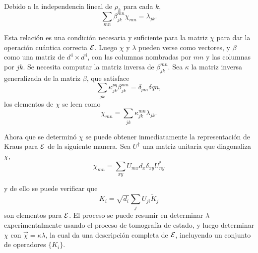 Debido a la independencia lineal de $\rho_k$ para cada $k$, 
\begin{equation}
    \sum_{mn}\beta_{jk}^{mn}\chi_{mn}=\lambda_{jk}.
\end{equation}

Esta relación es una condición necesaria y suficiente para la matriz $\chi$ para dar la operación cuántica correcta $\mathcal{E}$. Luego $\chi$ y $\lambda$ pueden verse como vectores, y $\beta$ como una matriz de $d^4\times d^4$, con las columnas nombradas por ${mn}$ y las columnas por ${jk}$. Se necesita computar la matriz inversa de $\beta_{jk}^{mn}$. Sea $\kappa$ la matriz inversa generalizada de la matriz $\beta$, que satisface \[\sum_{jk}\kappa_{jk}^{pq}\beta_{jk}^{mn}=\delta_{pm}\delta{qn},\] los elementos de $\chi$ se leen como 
\begin{equation}
    \chi_{mn}=\sum_{jk}\kappa_{jk}^{mn}\lambda_{jk}.
\end{equation}

Ahora que se determinó $\chi$ se puede obtener inmediatamente la representación de Kraus para $\mathcal{E}$ de la siguiente manera. Sea $U^\dagger$ una matriz unitaria que diagonaliza $\chi$,
\begin{equation}
    \chi_{mn}=\sum_{xy}U_{mx}d_x\delta_{xy}U_{ny}^*
\end{equation}

y de ello se puede verificar que  \begin{equation}
    K_i=\sqrt{d_i} \sum_j U_{ji}\tilde{K}_j
\end{equation} son elementos para $\mathcal{E}$. El proceso se puede resumir en determinar $\lambda$ experimentalmente usando el proceso de tomografía de estado, y luego determinar $\chi$ con $\vec{\chi}=\kappa\lambda$, la cual da una descripción completa de $\mathcal{E}$, incluyendo un conjunto de operadores $\{K_i\}$.







